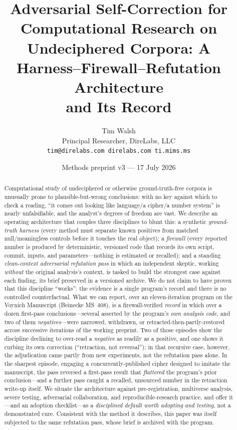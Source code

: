 \documentclass[11pt]{article}
\title{\textbf{Adversarial Self-Correction for Computational Research on\\
Undeciphered Corpora: A Harness--Firewall--Refutation Architecture\\ and Its Record}}
\author{Tim Walsh \\ \small Principal Researcher, DireLabs, LLC \\
\small \texttt{tim@direlabs.com \quad direlabs.com \quad ti.mims.ms}}
\date{Methods preprint v3 --- 17 July 2026}
\begin{document}
\maketitle

\begin{abstract}
\noindent Computational study of undeciphered or otherwise ground-truth-free corpora is
unusually prone to plausible-but-wrong conclusions: with no key against which to check a
reading, ``it comes out looking like language/a cipher/a number system'' is nearly
unfalsifiable, and the analyst's degrees of freedom are vast. We describe an operating
architecture that couples three disciplines to blunt this: a synthetic \emph{ground-truth
harness} (every method must separate known positives from matched null/meaningless controls
before it touches the real object); a \emph{firewall} (every reported number is produced by
deterministic, versioned code that records its own script, commit, inputs, and
parameters---nothing is estimated or recalled); and a standing \emph{clean-context
adversarial refutation pass} in which an independent skeptic, working \emph{without} the
original analysis's context, is tasked to build the strongest case against each finding, its
brief preserved in a versioned archive. We do not claim to have proven that this discipline
``works'': the evidence is a single program's record and there is no controlled
counterfactual. What we can report, over an eleven-iteration program on the Voynich Manuscript
(Beinecke MS~408), is a firewall-verified \emph{record} in which over a dozen first-pass
conclusions---several asserted by the program's \emph{own analysis code}, and two of them
\emph{negatives}---were narrowed, withdrawn, or retracted-then-partly-restored across
successive iterations of the working preprint. Two of those episodes show the discipline
declining to over-read a \emph{negative} as readily as a positive, and one shows it curbing
its own correction (``retraction, not reversal''); in that recursive case, however, the
adjudication came partly from new experiments, not the refutation pass alone. In the
sharpest episode, engaging a concurrently-published cipher designed to imitate the manuscript,
the pass reversed a first-pass result that \emph{flattered} the program's prior conclusion---and
a further pass caught a recalled, unsourced number in the retraction write-up itself. We situate the
architecture against pre-registration, multiverse analysis, severe testing, adversarial
collaboration, and reproducible-research practice, and offer it---and an adoption
checklist---as a \emph{disciplined default worth adopting and testing}, not a demonstrated
cure. Consistent with the method it describes, this paper was itself subjected to the same
refutation pass, whose brief is archived with the program.
\end{abstract}
\end{document}
